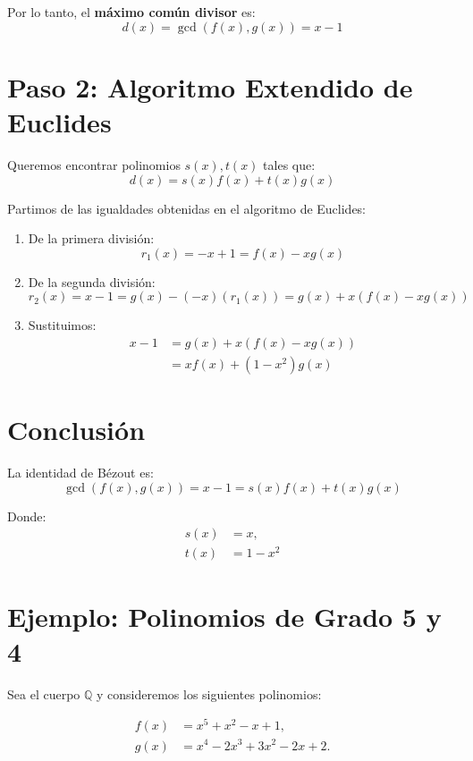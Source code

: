 \documentclass[12pt]{article}
\begin{document}
Por lo tanto, el \textbf{máximo común divisor} es:
\[
  d(x) = \gcd(f(x), g(x)) = x - 1
\]

\section*{Paso 2: Algoritmo Extendido de Euclides}

Queremos encontrar polinomios \( s(x), t(x) \) tales que:
\[
  d(x) = s(x)f(x) + t(x)g(x)
\]

Partimos de las igualdades obtenidas en el algoritmo de Euclides:

\begin{enumerate}
  \item De la primera división:
  \[
    r_1(x) = -x + 1 = f(x) - x g(x)
  \]

  \item De la segunda división:
  \[
    r_2(x) = x - 1 = g(x) - (-x)(r_1(x)) = g(x) + x(f(x) - xg(x))
  \]

  \item Sustituimos:
  \begin{align*}
    x - 1 &= g(x) + x(f(x) - xg(x)) \\
          &= x f(x) + (1 - x^2) g(x)
  \end{align*}

\end{enumerate}

\section*{Conclusión}

La identidad de Bézout es:
\[
  \gcd(f(x), g(x)) = x - 1 = s(x) f(x) + t(x) g(x)
\]

Donde:
\begin{align*}
  s(x) &= x, \\
  t(x) &= 1 - x^2
\end{align*}


\section*{Ejemplo: Polinomios de Grado 5 y 4}

Sea el cuerpo \(\mathbb{Q}\) y consideremos los siguientes polinomios:

\begin{align*}
  f(x) &= x^5 + x^2 - x + 1, \\
  g(x) &= x^4 - 2x^3 + 3x^2 - 2x + 2.
\end{align*}
\end{document}
